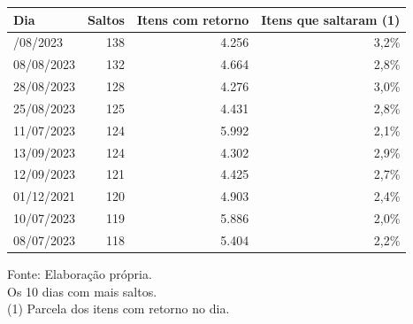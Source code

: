 \begingroup
\setlength{}
\setlength{}
\fontsize{12.0pt}{14.4pt}\selectfont

\setlength{\LTpost}{0mm}
\begin{longtable}{@{\extracolsep{\fill}}lrrr}

\toprule
\textbf{Dia} & \textbf{Saltos} & \textbf{Itens com retorno} & \textbf{Itens que saltaram} (1) \\ 
\midrule\addlinespace[2.5pt]
27/08/2023 & 138 & 4.256 & 3,2\% \\
08/08/2023 & 132 & 4.664 & 2,8\% \\
28/08/2023 & 128 & 4.276 & 3,0\% \\
25/08/2023 & 125 & 4.431 & 2,8\% \\
11/07/2023 & 124 & 5.992 & 2,1\% \\
13/09/2023 & 124 & 4.302 & 2,9\% \\
12/09/2023 & 121 & 4.425 & 2,7\% \\
01/12/2021 & 120 & 4.903 & 2,4\% \\
10/07/2023 & 119 & 5.886 & 2,0\% \\
08/07/2023 & 118 & 5.404 & 2,2\% \\
\bottomrule
\end{longtable}
\begin{minipage}{\linewidth}
Fonte: Elaboração própria.\\
Os 10 dias com mais saltos.\\
(1) Parcela dos itens com retorno no dia.\\
\end{minipage}
\endgroup
